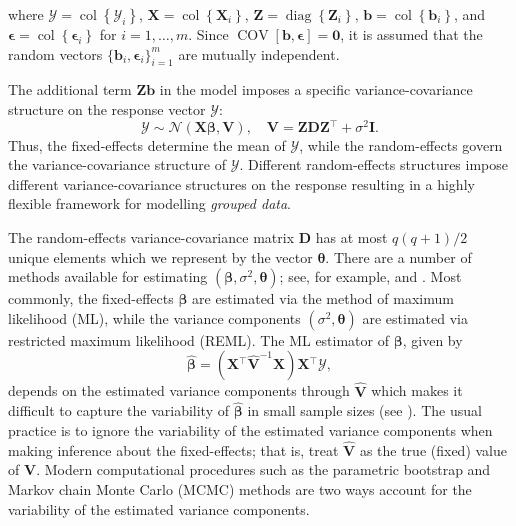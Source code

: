 \documentclass{article}\usepackage[]{graphicx}\usepackage[]{color}
\newcommand{\trans}{\ensuremath{^\top}}
\newcommand{\diag}{\operatorname{diag}}
\newcommand{\col}{\operatorname{col}}
\newcommand{\COV}{\operatorname{COV}}
\begin{document}
where $\bm{\mathcal{Y}} = \col\left\{\bm{\mathcal{Y}}_i\right\}$, $\bm{X} = \col\left\{\bm{X}_i\right\}$, $\bm{Z} = \diag\left\{\bm{Z}_i\right\}$, $\bm{b} = \col\left\{\bm{b}_i\right\}$, and $\bm{\epsilon} = \col\left\{\bm{\epsilon}_i\right\}$ for $i = 1, \dotsc, m$.  Since $\COV\left[\bm{b}, \bm{\epsilon}\right] = \bm{0}$, it is assumed that the random vectors $\big\{ \bm{b}_i, \bm{\epsilon}_i \big\}_{i=1}^m$ are mutually independent.

The additional term $\bm{Z}\bm{b}$ in the model imposes a specific variance-covariance structure on the response vector $\bm{\mathcal{Y}}$:
\[
  \bm{\mathcal{Y}} \sim \mathcal{N}\left(\bm{X}\bm{\beta}, \bm{V}\right), \quad \bm{V} = \bm{Z}\bm{D}\bm{Z}\trans + \sigma^2\bm{I}.
\]
Thus, the fixed-effects determine the mean of $\bm{\mathcal{Y}}$, while the random-effects govern the variance-covariance structure of $\bm{\mathcal{Y}}$.  Different random-effects structures impose different variance-covariance structures on the response resulting in a highly flexible framework for modelling \emph{grouped data}.

The random-effects variance-covariance matrix $\bm{D}$ has at most $q(q+1)/2$ unique elements which we represent by the vector $\bm{\theta}$.  There are a number of methods available for estimating $\left( \bm{\beta}, \sigma^2, \bm{\theta} \right)$; see, for example, \citet[chap 6.]{mcculloch_generalized_2008} and \citet[chap. 2]{demidenko_mixed_2013}.  Most commonly, the fixed-effects $\bm{\beta}$ are estimated via the method of maximum likelihood (ML), while the variance components $\left(\sigma^2, \bm{\theta}\right)$ are estimated via restricted maximum likelihood (REML).  The ML estimator of $\bm{\beta}$, given by
\begin{equation*}
\widehat{\bm{\beta}} = \left( \bm{X}\trans \widehat{\bm{V}}^{-1} \bm{X} \right)\bm{X}\trans\bm{\mathcal{Y}},
\end{equation*}
depends on the estimated variance components through $\widehat{\bm{V}}$ which makes it difficult to capture the variability of $\widehat{\bm{\beta}}$ in small sample sizes (see \citet[pp. 165-167]{mcculloch_generalized_2008}).  The usual practice is to ignore the variability of the estimated variance components when making inference about the fixed-effects; that is, treat $\widehat{\bm{V}}$ as the true (fixed) value of $\bm{V}$.  Modern computational procedures such as the parametric bootstrap and Markov chain Monte Carlo (MCMC) methods are two ways account for the variability of the estimated variance components.
\end{document}
